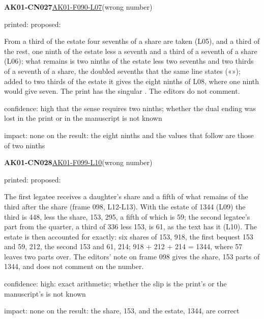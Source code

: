 \documentclass[11pt]{article}
\begin{document}
\noindent\textbf{AK01-CN027}\enspace\hyperlink{AK01-F090-L07}{AK01-F090-L07}\enspace(wrong number)\par\noindent printed: \enspace proposed: \par\noindent From a third of the estate four sevenths of a share are taken (L05), and a third of the rest, one ninth of the estate less a seventh and a third of a seventh of a share (L06); what remains is two ninths of the estate less two sevenths and two thirds of a seventh of a share, the doubled sevenths that the same line states («»); added to two thirds of the estate it gives the eight ninths of L08, where one ninth would give seven. The print has the singular . The editors do not comment.\par\noindent confidence: high that the sense requires two ninths; whether the dual ending was lost in the print or in the manuscript is not known\par\noindent impact: none on the result: the eight ninths and the values that follow are those of two ninths\par\medskip
\noindent\textbf{AK01-CN028}\enspace\hyperlink{AK01-F099-L10}{AK01-F099-L10}\enspace(wrong number)\par\noindent printed: \enspace proposed: \par\noindent The first legatee receives a daughter's share and a fifth of what remains of the third after the share (frame 098, L12-L13). With the estate of 1344 (L09) the third is 448, less the share, 153, 295, a fifth of which is 59; the second legatee's part from the quarter, a third of 336 less 153, is 61, as the text has it (L10). The estate is then accounted for exactly: six shares of 153, 918, the first bequest 153 and 59, 212, the second 153 and 61, 214; 918 + 212 + 214 = 1344, where 57 leaves two parts over. The editors' note on frame 098 gives the share, 153 parts of 1344, and does not comment on the number.\par\noindent confidence: high: exact arithmetic; whether the slip is the print's or the manuscript's is not known\par\noindent impact: none on the result: the share, 153, and the estate, 1344, are correct\par\medskip
\end{document}

